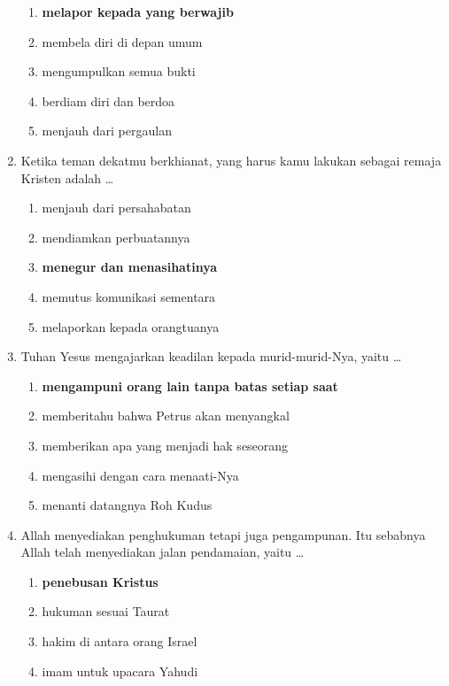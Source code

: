 \documentclass[12pt]{article}
\begin{document}
\begin{enumerate}
\begin{enumerate}
                \item \textbf{melapor kepada yang berwajib}
                \item membela diri di depan umum
                \item mengumpulkan semua bukti
                \item berdiam diri dan berdoa 
                \item menjauh dari pergaulan
            \end{enumerate}
        \item Ketika teman dekatmu berkhianat, yang harus kamu lakukan sebagai remaja Kristen
            adalah \dots
            \begin{enumerate}
                \item menjauh dari persahabatan
                \item mendiamkan perbuatannya
                \item \textbf{menegur dan menasihatinya}
                \item memutus komunikasi sementara
                \item melaporkan kepada orangtuanya
            \end{enumerate}
        \item Tuhan Yesus mengajarkan keadilan kepada murid-murid-Nya, yaitu \dots
            \begin{enumerate}
                \item \textbf{mengampuni orang lain tanpa batas setiap saat}
                \item memberitahu bahwa Petrus akan menyangkal
                \item memberikan apa yang menjadi hak seseorang
                \item mengasihi dengan cara menaati-Nya
                \item menanti datangnya Roh Kudus
            \end{enumerate}
        \item Allah menyediakan penghukuman tetapi juga pengampunan. Itu sebabnya Allah 
            telah menyediakan jalan pendamaian, yaitu \dots
            \begin{enumerate}
                \item \textbf{penebusan Kristus}
                \item hukuman sesuai Taurat
                \item hakim di antara orang Israel
                \item imam untuk upacara Yahudi

\end{enumerate}
\end{enumerate}
\end{document}

